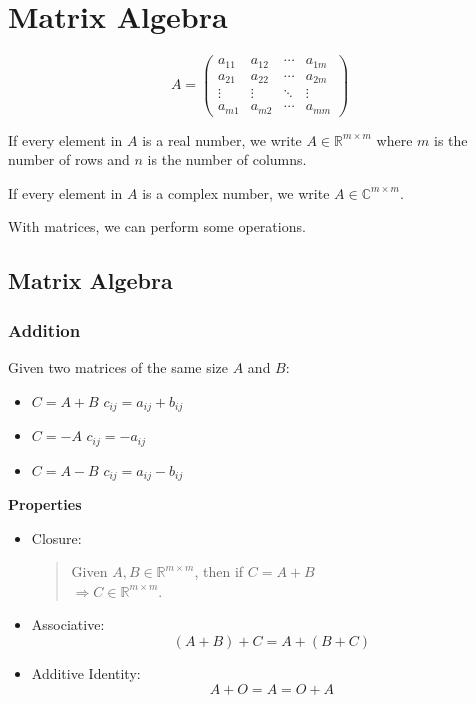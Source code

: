 \chapter[short]{Matrix Algebra}


\[
A = \begin{pmatrix}
a_{11} & a_{12} & \cdots & a_{1m} \\
a_{21} & a_{22} & \cdots & a_{2m} \\
\vdots & \vdots & \ddots & \vdots \\
a_{m1} & a_{m2} & \cdots & a_{mm}
\end{pmatrix}
\]

If every element in $A$ is a real number, we write $A \in \mathbb{R}^{m \times m}$ where $m$ is the number of rows and $n$ is the number of columns.

If every element in $A$ is a complex number, we write $A \in \mathbb{C}^{m \times m}$.

With matrices, we can perform some operations.

\section{Matrix Algebra}

\subsection{Addition}
Given two matrices of the same size $A$ and $B$:
\begin{itemize}
    \item $C = A + B$ \quad $c_{ij} = a_{ij} + b_{ij}$
    \item $C = -A$ \quad $c_{ij} = -a_{ij}$
    \item $C = A - B$ \quad $c_{ij} = a_{ij} - b_{ij}$
\end{itemize}

\textbf{Properties}
\begin{itemize}
    \item Closure:
    \begin{quote}
    Given $A, B \in \mathbb{R}^{m \times m}$, then if $C = A + B$ \\
    $\Rightarrow C \in \mathbb{R}^{m \times m}$.
    \end{quote}
    
    \item Associative:
    \begin{equation*}
    (A + B) + C = A + (B + C)
    \end{equation*}
    
    \item Additive Identity:
    \begin{equation*}
    A + O = A = O + A
    \end{equation*}
\end{itemize}

